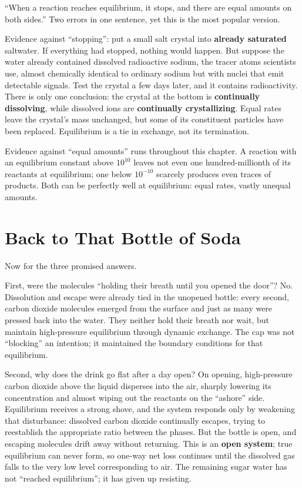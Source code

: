 \begin{wuqu}
``When a reaction reaches equilibrium, it stops, and there are equal amounts on both sides.'' Two errors in one sentence, yet this is the most popular version.

Evidence against ``stopping'': put a small salt crystal into \textbf{already saturated} saltwater. If everything had stopped, nothing would happen. But suppose the water already contained dissolved radioactive sodium, the tracer atoms scientists use, almost chemically identical to ordinary sodium but with nuclei that emit detectable signals. Test the crystal a few days later, and it contains radioactivity. There is only one conclusion: the crystal at the bottom is \textbf{continually dissolving}, while dissolved ions are \textbf{continually crystallizing}. Equal rates leave the crystal's mass unchanged, but some of its constituent particles have been replaced. Equilibrium is a tie in exchange, not its termination.

Evidence against ``equal amounts'' runs throughout this chapter. A reaction with an equilibrium constant above $10^{10}$ leaves not even one hundred-millionth of its reactants at equilibrium; one below $10^{-10}$ scarcely produces even traces of products. Both can be perfectly well at equilibrium: equal rates, vastly unequal amounts.
\end{wuqu}

\section{Back to That Bottle of Soda}

Now for the three promised answers.

First, were the molecules ``holding their breath until you opened the door''? No. Dissolution and escape were already tied in the unopened bottle: every second, carbon dioxide molecules emerged from the surface and just as many were pressed back into the water. They neither hold their breath nor wait, but maintain high-pressure equilibrium through dynamic exchange. The cap was not ``blocking'' an intention; it maintained the boundary conditions for that equilibrium.

Second, why does the drink go flat after a day open? On opening, high-pressure carbon dioxide above the liquid disperses into the air, sharply lowering its concentration and almost wiping out the reactants on the ``ashore'' side. Equilibrium receives a strong shove, and the system responds only by weakening that disturbance: dissolved carbon dioxide continually escapes, trying to reestablish the appropriate ratio between the phases. But the bottle is open, and escaping molecules drift away without returning. This is an \textbf{open system}; true equilibrium can never form, so one-way net loss continues until the dissolved gas falls to the very low level corresponding to air. The remaining sugar water has not ``reached equilibrium''; it has given up resisting.

